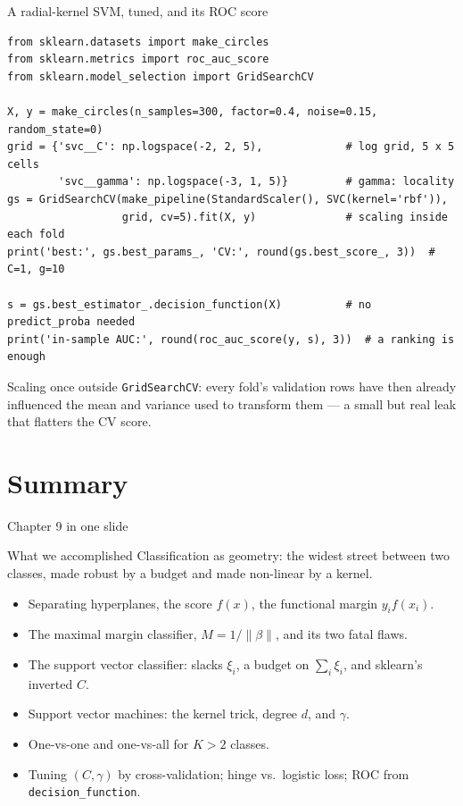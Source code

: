\documentclass[aspectratio=169,11pt]{beamer}
\begin{document}
\begin{frame}[fragile]{A radial-kernel SVM, tuned, and its ROC score}
  \begin{lstlisting}[basicstyle=\ttfamily\scriptsize]
from sklearn.datasets import make_circles
from sklearn.metrics import roc_auc_score
from sklearn.model_selection import GridSearchCV

X, y = make_circles(n_samples=300, factor=0.4, noise=0.15, random_state=0)
grid = {'svc__C': np.logspace(-2, 2, 5),             # log grid, 5 x 5 cells
        'svc__gamma': np.logspace(-3, 1, 5)}         # gamma: locality
gs = GridSearchCV(make_pipeline(StandardScaler(), SVC(kernel='rbf')),
                  grid, cv=5).fit(X, y)              # scaling inside each fold
print('best:', gs.best_params_, 'CV:', round(gs.best_score_, 3))  # C=1, g=10

s = gs.best_estimator_.decision_function(X)          # no predict_proba needed
print('in-sample AUC:', round(roc_auc_score(y, s), 3))  # a ranking is enough
  \end{lstlisting}
  \begin{mistake}
    Scaling once outside \texttt{GridSearchCV}: every fold's validation rows
    have then already influenced the mean and variance used to transform them
    --- a small but real leak that flatters the CV score.
  \end{mistake}
\end{frame}

\section{Summary}

\begin{frame}{Chapter 9 in one slide}
  \footnotesize
  \begin{block}{What we accomplished}
    Classification as geometry: the widest street between two classes, made
    robust by a budget and made non-linear by a kernel.
  \end{block}
  \begin{itemize}
    \item Separating hyperplanes, the score $f(x)$, the functional margin
          $y_i f(x_i)$.
    \item The maximal margin classifier, $M=1/\|\beta\|$, and its two fatal
          flaws.
    \item The support vector classifier: slacks $\xi_i$, a budget on
          $\sum_i\xi_i$, and sklearn's inverted $C$.
    \item Support vector machines: the kernel trick, degree $d$, and $\gamma$.
    \item One-vs-one and one-vs-all for $K>2$ classes.
    \item Tuning $(C,\gamma)$ by cross-validation; hinge vs.\ logistic loss;
          ROC from \texttt{decision\_function}.
  \end{itemize}
\end{frame}
\end{document}
